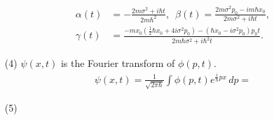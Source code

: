 \documentclass[floatfix,nofootinbib,superscriptaddress,fleqn]{revtex4}
\begin{document}
\begin{itemize}
\begin{align}
        \alpha(t) &= -\frac{2m\sigma^2+i\hbar t}{2m\hbar^2}, \,\,\,
        \beta(t) = \frac{2m\sigma^2p_0-im\hbar x_0}{2m\sigma^2+i\hbar t}, \\
        \gamma(t) &= \frac{-m x_0 \left(\frac{1}{2}\hbar x_0+4i\sigma^2p_0\right)
                    -(\hbar x_0-i\sigma^2 p_0)p_0 t}
                   {2m\hbar\sigma^2+i\hbar^2t}.
  \end{align}
  \item[(4)] $\psi(x,t)$ is the Fourier transform of $\phi(p,t)$.
  \begin{align}
    \psi(x,t) = \frac{1}{\sqrt{2\pi\hbar}}\int\phi(p,t)e^{\frac{i}{\hbar}px}\,dp = 
  \end{align}
  \item[(5)] 
  \end{itemize}
\vspace{0.5cm}
\end{document}
